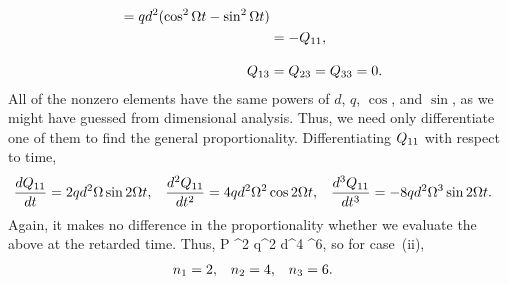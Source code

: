\begin{solution}
\begin{align*}
		= q d^2 (\cos^2 \Omega t - \sin^2 \Omega t) \\
		&= -Q_{11}, \\[2ex]
		Q_{13} &= Q_{23} = Q_{33} = 0.
	\end{align*}
	All of the nonzero elements have the same powers of $d$, $q$, $\cos$, and $\sin$, as we might have guessed from dimensional analysis.  Thus, we need only differentiate one of them to find the general proportionality.  Differentiating $Q_{11}$ with respect to time,
	\begin{align*}
		\dv{Q_{11}}{t} &= 2 q d^2 \Omega \sin 2\Omega t, &
		\dv[2]{Q_{11}}{t} &= 4 q d^2 \Omega^2 \cos 2\Omega t, &
		\dv[3]{Q_{11}}{t} &= -8 q d^2 \Omega^3 \sin 2\Omega t.
	\end{align*}
	Again, it makes no difference in the proportionality whether we evaluate the above at the retarded time.  Thus,
	\beq
		P \propto {}^2
		\propto q^2 d^4 \Omg^6,
	\eeq
	so for case~(ii),
	\begin{align*}
		{n_1} &= 2, &
		{n_2} &= 4, &
		{n_3} &= 6.
	\end{align*}
	\vfix
\end{solution}